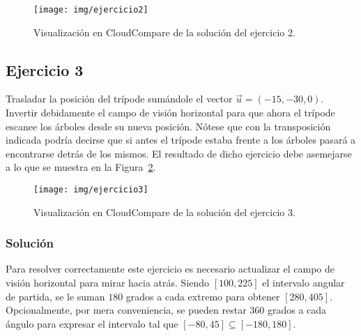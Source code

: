 \documentclass[]{article}
\begin{document}
	\begin{figure}[htb]
		\centering
		\texttt{[image: img/ejercicio2]}
		\caption{Visualización en CloudCompare de la solución del ejercicio 2.}
		\label{fig:ejercicio2}
	\end{figure} 

	
	\pagebreak


	\subsection*{Ejercicio 3}
	Trasladar la posición del trípode sumándole el vector $\vec{u}=(-15, -30, 0)$. Invertir debidamente el campo de visión horizontal para que ahora el trípode escanee los árboles desde su nueva posición. Nótese que con la transposición indicada podría decirse que si antes el trípode estaba frente a los árboles pasará a encontrarse detrás de los mismos. El resultado de dicho ejercicio debe asemejarse a lo que se muestra en la Figura~\ref{fig:ejercicio3}.
	
	\begin{figure}[htb]
		\centering
		\texttt{[image: img/ejercicio3]}
		\caption{Visualización en CloudCompare de la solución del ejercicio 3.}
		\label{fig:ejercicio3}
	\end{figure} 

	\subsubsection*{Solución}
	Para resolver correctamente este ejercicio es necesario actualizar el campo de visión horizontal para mirar hacia atrás. Siendo $[100, 225]$ el intervalo angular de partida, se le suman $180$ grados a cada extremo para obtener $[280, 405]$. Opcionalmente, por mera conveniencia, se pueden restar $360$ grados a cada ángulo para expresar el intervalo tal que $[-80, 45] \subseteq [-180, 180]$.
\end{document}

